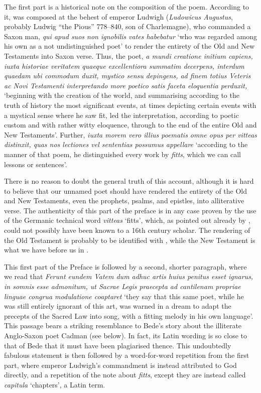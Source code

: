 The first part is a historical note on the composition of the poem.  According to it,  was composed at the behest of emperor Ludwigh (\emph{Ludowicus Augustus}, probably Ludwig “the Pious” 778--840, son of Charlemagne), who commanded a Saxon man, \emph{qui apud suos non ignobilis vates habebatur} ‘who was regarded among his own as a not undistinguished poet’ to render the entirety of the Old and New Testaments into Saxon verse.
Thus, the poet, \emph{a mundi creatione initium capiens, iuxta historiae veritatem quaeque excellentiora summatim decerpens, interdum quaedam ubi commodum duxit, mystico sensu depingens, ad finem totius Veteris ac Novi Testamenti interpretando more poetico satis faceta eloquentia perduxit,} ‘beginning with the creation of the world, and summarising according to the truth of history the most significant events, at times depicting certain events with a mystical sense where he saw fit, led the interpretation, according to poetic custom and with rather witty eloquence, through to the end of the entire Old and New Testaments’.  Further, \emph{iuxta morem vero illius poematis omne opus per vitteas distinxit, quas nos lectiones vel sententias possumus appellare} ‘according to the manner of that poem, he distinguished every work by \emph{fitts}, which we can call lessons or sentences’.

There is no reason to doubt the general truth of this account, although it is hard to believe that our unnamed poet should have rendered the entirety of the Old and New Testaments, even the prophets, psalms, and epistles, into alliterative verse.  The authenticity of this part of the preface is in any case proven by the use of the Germanic technical word \emph{vitteas} ‘fitts’, which, as pointed out already by \textcite[xxv]{Sievers1878}, could not possibly have been known to a 16th century scholar.  The rendering of the Old Testament is probably to be identified with , while the New Testament is what we have before us in .

This first part of the Preface is followed by a second, shorter paragraph, where we read that \emph{Ferunt eundem Vatem dum adhuc artis huius penitus esset ignarus, in somnis esse admonitum, ut Sacrae Legis praecepta ad cantilenam propriae linguae congrua modulatione coaptaret} ‘they say that this same poet, while he was still entirely ignorant of this art, was warned in a dream to adapt the precepts of the Sacred Law into song, with a fitting melody in his own language’.   This passage bears a striking resemblance to Bede’s story about the illiterate Anglo-Saxon poet Cadman (see  below).  In fact, its Latin wording is so close to that of Bede that it must have been plagiarised thence.  This undoubtedly fabulous statement is then followed by a word-for-word repetition from the first part, where emperor Ludwigh’s commandment is instead attributed to God directly, and a repetition of the note about \emph{fitts}, except they are instead called \emph{capitula} ‘chapters’, a Latin term.

